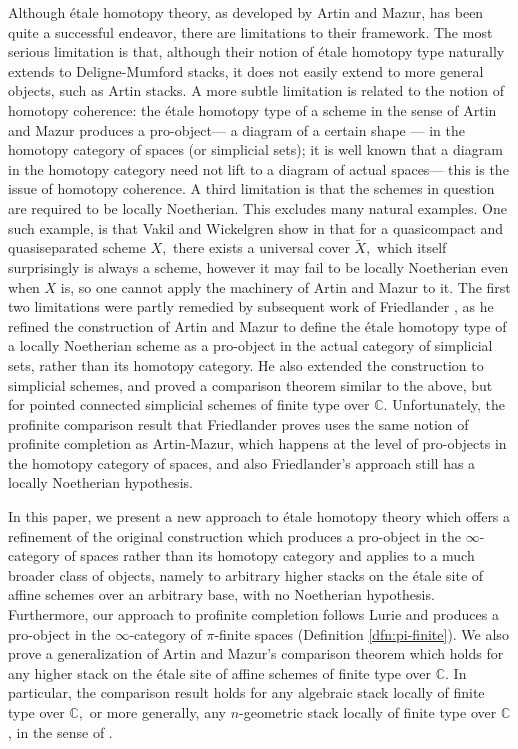 \documentclass[12pt]{amsart}
\theoremstyle{definition}
\newcommand{\bC}{\mathbb{C}}
\renewcommand{\i}{\infty}
\begin{document}
Although \'etale homotopy theory, as developed by Artin and Mazur, has been quite a successful endeavor, there are limitations to their framework. The most serious limitation is that, although their notion of \'etale homotopy type naturally extends to Deligne-Mumford stacks, it does not easily extend to more general objects, such as Artin stacks. A more subtle limitation is related to the notion of homotopy coherence: the \'etale homotopy type of a scheme in the sense of Artin and Mazur produces a pro-object--- a diagram of a certain shape --- in the homotopy category of spaces (or simplicial sets);  it is well known that a diagram in the homotopy category need not lift to a diagram of actual spaces--- this is the issue of homotopy coherence. A third limitation is that 
the schemes in question are required to be locally Noetherian. This excludes many natural examples. One such example, is that Vakil and Wickelgren show in \cite{VW} that for a quasicompact and quasiseparated scheme $X,$ there exists a universal cover $\widetilde{X},$ which itself surprisingly is always a scheme, however it may fail to be locally Noetherian even when $X$ is, so one cannot apply the machinery of Artin and Mazur to it. The first two limitations were partly remedied by subsequent work of Friedlander \cite{Friedlander}, as he refined the construction of Artin and Mazur to define the \'etale homotopy type of a locally Noetherian scheme as a pro-object in the actual category of simplicial sets, rather than its homotopy category. He also extended the construction to simplicial schemes, and proved a comparison theorem similar to the above, but for pointed connected simplicial schemes of finite type over $\bC.$ Unfortunately, the profinite comparison result that Friedlander proves uses the same notion of profinite completion as Artin-Mazur, which happens at the level of pro-objects in the homotopy category of spaces, and also Friedlander's approach still has a locally Noetherian hypothesis.

In this paper, we present a new approach to \'etale homotopy theory which offers a refinement of the original construction which produces a pro-object
in the $\i$-category of spaces rather than its homotopy category and applies
to a much broader class of objects, namely to arbitrary higher stacks on the \'etale site of affine schemes over an arbitrary base, with no Noetherian hypothesis. Furthermore, our approach to profinite completion follows Lurie and produces a pro-object in the $\i$-category of $\pi$-finite spaces (Definition \ref{dfn:pi-finite}). We also prove a generalization of Artin and Mazur's comparison theorem which holds for any higher stack on the \'etale site of affine schemes of finite type over $\bC.$ In particular, the comparison result holds for any algebraic stack locally of finite type over $\bC,$ or more generally, any $n$-geometric stack locally of finite type over $\bC$, in the sense of \cite{TV2}.
\end{document}
